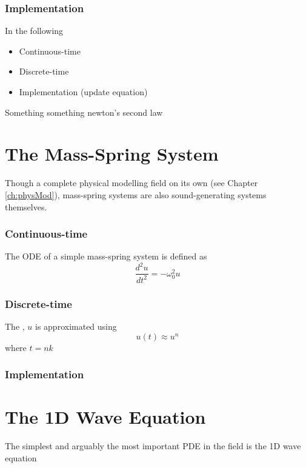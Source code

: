 \subsubsection{Implementation}
In the following 
\begin{itemize}
    \item Continuous-time
    \item Discrete-time
    \item Implementation (update equation)
\end{itemize}

Something something newton's second law

\section{%
The Mass-Spring System}
Though a complete physical modelling field on its own (see Chapter \ref{ch:physMod}), mass-spring systems are also sound-generating systems themselves.

\subsubsection{Continuous-time}
The ODE of a simple mass-spring system is defined as
\begin{equation}\label{eq:massSpringPDE}
    \frac{d^2u}{dt^2} = -\omega_0^2u
\end{equation}

\subsubsection{Discrete-time}
The , $u$ is approximated using 
\begin{equation}
    u(t) \approx u^n
\end{equation}
where $t = nk$

\subsubsection{Implementation}


\section{%
The 1D Wave Equation}
The simplest and arguably the most important PDE in the field is the 1D wave equation



